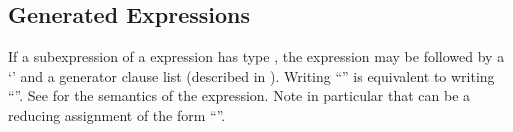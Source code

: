 %
%
%
%

\subsection{Generated Expressions}

If a subexpression of a  expression has type \TYP{()}, the
expression may be followed by a `\EXP{,}' and a generator clause list
(described in ).  Writing ``'' is equivalent to writing ``''.  See
 for the semantics of the  expression.  Note
in particular that  can be a reducing assignment of the form
``''.

